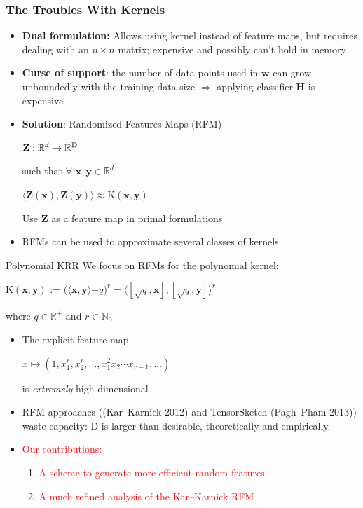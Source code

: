 \documentclass[xcolor=x11names,compress,ignorenonframetext,10pt]{beamer}
\renewcommand{\(}{\begin{columns}}
\renewcommand{\)}{\end{columns}}
\newcommand{\<}[1]{\begin{column}{#1}}
\renewcommand{\>}{\end{column}}
\def\refcolor{DodgerBlue4}
\newcommand{\refer}[1]{({\color{\refcolor}#1})}
\begin{document}
\begin{frame}
\frametitle{The Troubles With Kernels}
\begin{itemize}
    \item \textbf{Dual formulation:} Allows using kernel instead of feature maps, but requires dealing with an $n \times n$ matrix; expensive and possibly can't hold in memory
    \item \textbf{Curse of support}: the number of data points used in $\mathbf{w}$ can grow unboundedly with the training data size $\Rightarrow$ applying classifier $\mathbf{H}$ is expensive
\item \textbf{Solution}: Randomized Features Maps (RFM)\\
\begin{center}
$\textbf{Z}: \mathbb{R}^d \rightarrow \mathbb{R}^{\textrm{\textrm{D}}}$
\end{center}
such that $\forall$ $\mathbf{x}, \mathbf{y} \in \mathbb{R}^d$
\begin{center}
$\langle \textbf{Z}(\mathbf{x}), \textbf{Z}(\mathbf{y}) \rangle \approx \textrm{K}(\mathbf{x},\mathbf{y})$
\end{center}
Use $\mathbf{Z}$ as a feature map in primal formulations
\item RFMs can be used to approximate several classes of kernels
\end{itemize}
\end{frame}

\begin{frame}{Polynomial KRR}
  We focus on RFMs for the polynomial kernel:
\begin{center}
$\textrm{K}(\mathbf{x},\mathbf{y})$ := $(\langle \mathbf{x}, \mathbf{y} \rangle$$+q)^r = \langle [\sqrt{q}, \mathbf{x}], [\sqrt{q}, \mathbf{y}] \rangle^r$
\end{center}
where $q \in \mathbb{R}^{+}$ and $r \in \mathbb{N}_{0}$

\begin{itemize}
    \item The explicit feature map 
        \begin{center}
            $x \mapsto (1, x_1^r, x_2^r, \ldots, x_1^2 x_2 \cdots x_{r-1}, \ldots)$
        \end{center}
        is \emph{extremely} high-dimensional
      \item RFM approaches (\refer{Kar--Karnick 2012} and TensorSketch \refer{Pagh--Pham 2013}) waste capacity: $\mathrm{D}$ is larger than desirable, theoretically and empirically.
    
    \item \textcolor{red}{Our contributions:}
        \begin{enumerate}
            \item \textcolor{red}{A scheme to generate more efficient random features}
            \item\textcolor{red}{A much refined analysis of the Kar--Karnick RFM}
        \end{enumerate}
\end{itemize}

\end{frame}
\end{document}
